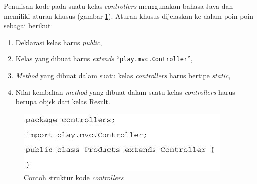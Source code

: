 Penulisan kode pada suatu kelas \textit{controllers} menggunakan bahasa Java dan memiliki aturan khusus (gambar \ref{fig:2_controllers2}). Aturan khusus dijelaskan ke dalam poin-poin sebagai berikut:
\begin{enumerate}
	\item Deklarasi kelas harus \textit{public},
	\item Kelas yang dibuat harus \textit{extends} ``\texttt{play.mvc.Controller}'',
	\item \textit{Method} yang dibuat dalam suatu kelas \textit{controllers} harus bertipe \textit{static},
	\item Nilai kembalian \textit{method} yang dibuat dalam suatu kelas \textit{controllers} harus berupa objek dari kelas Result.
\end{enumerate}

\begin{figure}[htbp]
	\centering	
		\includegraphics[scale=0.8]{Gambar/2_controllers2.JPG}
	\caption{Contoh struktur kode \textit{controllers}\cite{playforjava}}
	\label{fig:2_controllers2}
\end{figure}

